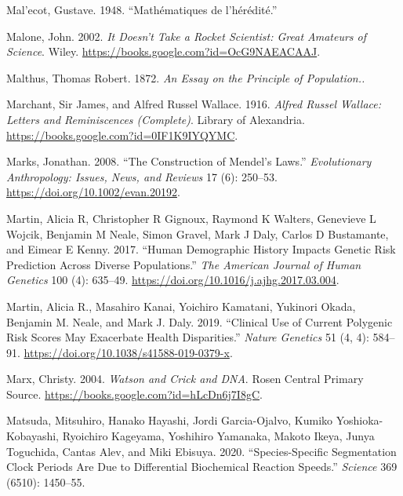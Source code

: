 \documentclass[
]{book}
\newlength{\cslhangindent}
\newlength{\cslentryspacingunit} %
\newenvironment{CSLReferences}[2] %
 {%
  \setlength{\parindent}{0pt}
  \ifodd #1
  \let\oldpar\par
  \def\par{\hangindent=\cslhangindent\oldpar}
  \fi
  \setlength{\parskip}{#2\cslentryspacingunit}
 }%
 {}
\begin{document}
\begin{CSLReferences}{1}{0}
\leavevmode{}%
Mal'ecot, Gustave. 1948. {``Mathématiques de l'hérédité.''}

\leavevmode{}%
Malone, John. 2002. \emph{It {Doesn}'t {Take} a {Rocket Scientist}: {Great Amateurs} of {Science}}. {Wiley}. \url{https://books.google.com?id=OcG9NAEACAAJ}.

\leavevmode{}%
Malthus, Thomas Robert. 1872. \emph{An {Essay} on the {Principle} of {Population}..}

\leavevmode{}%
Marchant, Sir James, and Alfred Russel Wallace. 1916. \emph{Alfred {Russel Wallace}: {Letters} and {Reminiscences} ({Complete})}. {Library of Alexandria}. \url{https://books.google.com?id=0IF1K9IYQYMC}.

\leavevmode{}%
Marks, Jonathan. 2008. {``The Construction of {Mendel}'s Laws.''} \emph{Evolutionary Anthropology: Issues, News, and Reviews} 17 (6): 250--53. \url{https://doi.org/10.1002/evan.20192}.

\leavevmode{}%
Martin, Alicia R, Christopher R Gignoux, Raymond K Walters, Genevieve L Wojcik, Benjamin M Neale, Simon Gravel, Mark J Daly, Carlos D Bustamante, and Eimear E Kenny. 2017. {``Human Demographic History Impacts Genetic Risk Prediction Across Diverse Populations.''} \emph{The American Journal of Human Genetics} 100 (4): 635--49. \url{https://doi.org/10.1016/j.ajhg.2017.03.004}.

\leavevmode{}%
Martin, Alicia R., Masahiro Kanai, Yoichiro Kamatani, Yukinori Okada, Benjamin M. Neale, and Mark J. Daly. 2019. {``Clinical Use of Current Polygenic Risk Scores May Exacerbate Health Disparities.''} \emph{Nature Genetics} 51 (4, 4): 584--91. \url{https://doi.org/10.1038/s41588-019-0379-x}.

\leavevmode{}%
Marx, Christy. 2004. \emph{Watson and {Crick} and {DNA}}. {Rosen Central Primary Source}. \url{https://books.google.com?id=hLcDn6j7I8gC}.

\leavevmode{}%
Matsuda, Mitsuhiro, Hanako Hayashi, Jordi Garcia-Ojalvo, Kumiko Yoshioka-Kobayashi, Ryoichiro Kageyama, Yoshihiro Yamanaka, Makoto Ikeya, Junya Toguchida, Cantas Alev, and Miki Ebisuya. 2020. {``Species-Specific Segmentation Clock Periods Are Due to Differential Biochemical Reaction Speeds.''} \emph{Science} 369 (6510): 1450--55.


\end{CSLReferences}
\end{document}
